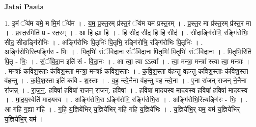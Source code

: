 \documentclass[17pt]{extarticle}
\begin{document}
\textbf{Jatai Paata} \newline

1. इ॒मं ॅय॑म यमे॒ म मि॒मं ॅय॑म । . य॒म॒ प्र॒स्त॒रम् प्र॑स्त॒रं ॅय॑म यम प्रस्त॒रम् । . प्र॒स्त॒र मा प्र॑स्त॒रम् प्र॑स्त॒र मा । . प्र॒स्त॒रमिति॑ प्र - स्त॒रम् । . आ हि ह्या हि । . हि सीद॒ सीद॒ हि हि सीद॑ । . सीदाङ्गि॑रोभि॒ रङ्गि॑रोभिः॒ सीद॒ सीदाङ्गि॑रोभिः । . अङ्गि॑रोभिः पि॒तृभिः॑ पि॒तृभि॒ रङ्गि॑रोभि॒ रङ्गि॑रोभिः पि॒तृभिः॑ । . अङ्गि॑रोभि॒रित्यङ्गि॑रः - भिः॒ । . पि॒तृभिः॑ संॅविदा॒नः सं॑ॅविदा॒नः पि॒तृभिः॑ पि॒तृभिः॑ संॅविदा॒नः । . पि॒तृभि॒रिति॑ पि॒तृ - भिः॒ । . सं॒ॅवि॒दा॒न इति॑ सं - वि॒दा॒नः । . आ त्वा॒ त्वा ऽऽत्वा᳚ । . त्वा॒ मन्त्रा॒ मन्त्रा᳚ स्त्वा त्वा॒ मन्त्राः᳚ । . मन्त्राः᳚ कविश॒स्ताः क॑विश॒स्ता मन्त्रा॒ मन्त्राः᳚ कविश॒स्ताः । . क॒वि॒श॒स्ता व॑हन्तु वहन्तु कविश॒स्ताः क॑विश॒स्ता व॑हन्तु । . क॒वि॒श॒स्ता इति॑ कवि - श॒स्ताः । . व॒ह॒ न्त्वे॒नैना व॑हन्तु वह न्त्वे॒ना । . ए॒ना रा॑जन् राजन् ने॒नैना रा॑जन्न् । . रा॒ज॒न्॒. ह॒विषा॑ ह॒विषा॑ राजन् राजन्. ह॒विषा᳚ । . ह॒विषा॑ मादयस्व मादयस्व ह॒विषा॑ ह॒विषा॑ मादयस्व । . मा॒द॒य॒स्वेति॑ मादयस्व । . अङ्गि॑रोभि॒रा ऽङ्गि॑रोभि॒ रङ्गि॑रोभि॒रा । . अङ्गि॑रोभि॒रित्यङ्गि॑रः - भिः॒ । . आ ग॑हि ग॒ह्या ग॑हि । . ग॒हि॒ य॒ज्ञिये॑भिर् य॒ज्ञिये॑भिर् गहि गहि य॒ज्ञिये॑भिः । . य॒ज्ञिये॑भि॒र् यम॒ यम॑ य॒ज्ञिये॑भिर् य॒ज्ञिये॑भि॒र् यम॑ । \newline
\end{document}
